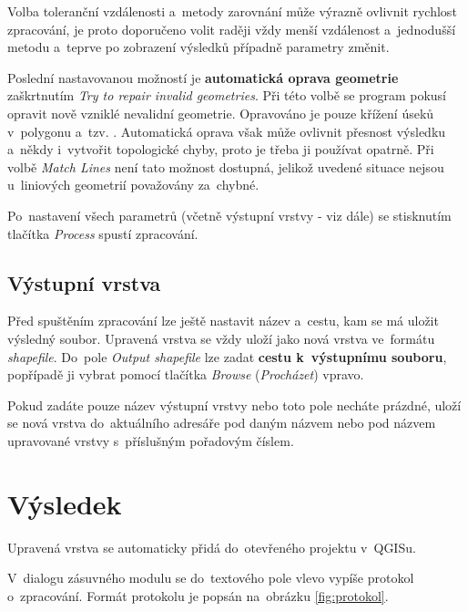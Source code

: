 Volba toleranční vzdálenosti a~metody zarovnání může výrazně ovlivnit rychlost 
zpracování, je proto doporučeno volit raději vždy menší vzdálenost a~jednodušší
metodu a~teprve po zobrazení výsledků případně parametry změnit.

Poslední nastavovanou možností je \textbf{automatická oprava geometrie}
 zaškrtnutím \textit{Try to repair invalid geometries}. Při této volbě se 
program pokusí opravit nově vzniklé nevalidní geometrie. Opravováno je pouze 
křížení úseků v~polygonu a~tzv. . Automatická oprava však 
může ovlivnit přesnost výsledku a~někdy i~vytvořit topologické chyby, proto 
je třeba ji používat opatrně. Při volbě \textit{Match Lines} není tato možnost
dostupná, jelikož uvedené situace nejsou u~liniových geometrií považovány
za~chybné.

Po~nastavení všech parametrů (včetně výstupní vrstvy - viz dále) se stisknutím 
tlačítka \textit{Process} spustí zpracování. 

\subsection{Výstupní vrstva}

Před spuštěním zpracování lze ještě nastavit název a~cestu, kam se má uložit
výsledný soubor. Upravená vrstva se vždy uloží jako nová vrstva ve~formátu 
\textit{shapefile}. Do~pole \textit{Output shapefile} lze zadat \textbf{cestu 
k~výstupnímu souboru}, popřípadě ji vybrat pomocí tlačítka \textit{Browse} 
(\textit{Procházet}) vpravo. 

Pokud zadáte pouze název výstupní vrstvy nebo toto pole necháte prázdné, 
uloží se nová vrstva do~aktuálního adresáře pod daným názvem nebo pod názvem
upravované vrstvy s~příslušným pořadovým číslem. 


\section{Výsledek}
\label{prirucka-vysledek}

Upravená vrstva se automaticky přidá do~otevřeného projektu v~QGISu.

V~dialogu zásuvného modulu se do~textového pole vlevo vypíše protokol o~zpracování.
Formát protokolu je popsán na~obrázku \ref{fig:protokol}.  

